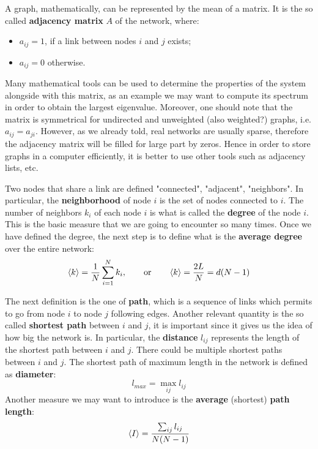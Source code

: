 \documentclass[../main/main.tex]{subfiles}
\begin{document}
A graph, mathematically, can be represented by the mean of a matrix. It is the so called \textbf{adjacency matrix} \( A \) of the network, where:
\begin{itemize}
\item \( a_{ij} = 1 \), if a link between nodes \( i \) and \( j \) exists;
\item \( a_{ij} = 0 \) otherwise.
\end{itemize}
Many mathematical tools can be used to determine the properties of the system alongside with this matrix, as an example we may want to compute its spectrum in order to obtain the largest eigenvalue. Moreover, one should note that the matrix is symmetrical for undirected and unweighted (also weighted?) graphs, i.e. \( a_{ij} = a_{ji} \).
However, as we already told, real networks are usually sparse, therefore the adjacency matrix will be filled for large part by zeros. Hence in order to store graphs in a computer efficiently, it is better to use other tools such as adjacency lists, etc.

Two nodes that share a link are defined "connected", "adjacent", "neighbors". In particular, the \textbf{neighborhood} of node \( i \) is the set of nodes connected to \( i \).
The number of neighbors \( k_i \) of each node \( i \) is what is called the \textbf{degree} of the node $i$. This is the basic measure that we are going to encounter so many times. Once we have defined the degree, the next step is to define what is the \textbf{average degree} over the entire network:
\begin{equation}
  \expval{k} = \frac{1}{N} \sum_{i=1}^{N} k_i, \qquad \text{or} \qquad \expval{k} = \frac{2L}{N} = d(N-1)
\end{equation}

The next definition is the one of \textbf{path}, which is a sequence of links which permits to go from node \( i \) to node \( j \) following edges. Another relevant quantity is the so called \textbf{shortest path} between \( i \) and \( j \), it is important since it gives us the idea of how big the network is. In particular, the \textbf{distance} \( l_{ij} \) represents the length of the shortest path between \( i \) and \( j \). There could be multiple shortest paths between \( i \) and \( j \).
The shortest path of maximum length in the network is defined as \textbf{diameter}:
\begin{equation*}
  l_{max} = \max_{ij} l_{ij}
\end{equation*}
Another measure we may want to introduce is the \textbf{average} (shortest) \textbf{path length}:
\begin{equation*}
  \expval{I} = \frac{\sum_{ij}^{} l_{ij} }{N(N-1)}
\end{equation*}
\end{document}
